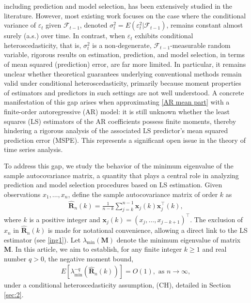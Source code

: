 \documentclass[ejsv2]{imsart}
\theoremstyle{plain}
\theoremstyle{definition}
\theoremstyle{remark}
\begin{document}
including prediction and model selection, has been extensively studied in the literature.
However, most existing work focuses on the case where the conditional variance of
$\varepsilon_{t}$ given
$\mathcal{F}_{t-1}$, denoted
$\sigma_t^{2}=E(\varepsilon_{t}^{2}|\mathcal{F}_{t-1})$,
remains constant almost surely (a.s.) over time.
In contrast,
when $\varepsilon_{t}$
exhibits conditional heteroscedasticity, that is, $\sigma_t^{2}$
is a non-degenerate, 
$\mathcal{F}_{t-1}$-measurable random variable, rigorous results on estimation, prediction, and model selection, in terms of mean squared (prediction) error, are far more limited.
In particular, it remains unclear whether theoretical guarantees underlying conventional methods remain valid under conditional heteroscedasticity, primarily because moment properties of estimators and predictors in such settings are not well understood. 
 A concrete manifestation of this gap arises when approximating
\eqref{AR mean part}
with a finite-order autoregressive (AR) model: it is still unknown whether the least squares (LS) estimators of the AR coefficients possess finite moments, thereby hindering a rigorous analysis of the associated LS predictor's
mean squared prediction error (MSPE). This represents a significant open issue in the theory of time series analysis.








To address this gap, we study the behavior of the minimum eigenvalue of the sample autocovariance matrix, a quantity that plays a central role in analyzing prediction and model selection procedures based on LS estimation.
Given observations $x_1, \ldots, x_n$, define the sample autocovariance matrix of order $k$ as
\begin{eqnarray*}
\hat{\mathbf{R}}_n(k)=\frac{1}{n-k}\sum_{j=k}^{n-1}\mathbf{x}_j(k)\mathbf{x}^\top_j(k),
\end{eqnarray*}
where $k$ is a positive integer and $\mathbf{x}_j(k)=(x_j,\ldots,x_{j-k+1})^\top$. The exclusion of $x_n$ in $\hat{\mathbf{R}}_n(k)$ is made for notational convenience, allowing 
a direct link to the LS estimator
(see \eqref{ing1}). 
Let $\lambda_{\min}(\mathbf{M})$ denote the minimum eigenvalue of matrix $\mathbf{M}$.
In this article, we aim to establish, for any finite
integer $k\geq 1$
and real number $q>0$, the negative moment bound,
\begin{eqnarray}
\label{t.fisher.inverse moment}
E[\lambda_{\min}^{-q}(\hat{\mathbf{R}}_n(k))]=O(1), \,\, \mbox{as}\,\, n \to \infty,
\end{eqnarray}
under a conditional heteroscedasticity assumption, (CH), detailed in Section
\ref{sec:2}.
\end{document}
